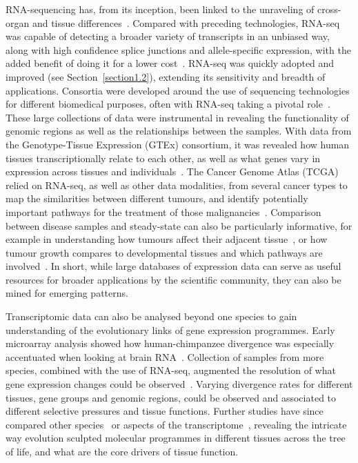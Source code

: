 RNA-sequencing has, from its inception, been linked to the unraveling of cross-organ and tissue differences~\citep{mortazavi_mapping_2008}. Compared with preceding technologies, RNA-seq was capable of detecting a broader variety of transcripts in an unbiased way, along with high confidence splice junctions and allele-specific expression, with the added benefit of doing it for a lower cost~\citep{wang_rna-seq:_2009}. RNA-seq was quickly adopted and improved (see Section~\ref{section1.2}), extending its sensitivity and breadth of applications. Consortia were developed around the use of sequencing technologies for different biomedical purposes, often with RNA-seq taking a pivotal role~\citep{the_cancer_genome_atlas_research_network_cancer_2013,the_encode_project_consortium_integrated_2012,lonsdale_genotype-tissue_2013}. These large collections of data were instrumental in revealing the functionality of genomic regions as well as the relationships between the samples. With data from the Genotype-Tissue Expression (GTEx) consortium, it was revealed how human tissues transcriptionally relate to each other, as well as what genes vary in expression across tissues and individuals~\citep{mele_human_2015}. The Cancer Genome Atlas (TCGA) relied on RNA-seq, as well as other data modalities, from several cancer types to map the similarities between different tumours, and identify potentially important pathways for the treatment of those malignancies~\citep{hoadley_cell--origin_2018}. Comparison between disease samples and steady-state can also be particularly informative, for example in understanding how tumours affect their adjacent tissue~\citep{aran_comprehensive_2017}, or how tumour growth compares to developmental tissues and which pathways are involved~\citep{young_single-cell_2018}. In short, while large databases of expression data can serve as useful resources for broader applications by the scientific community, they can also be mined for emerging patterns.

Transcriptomic data can also be analysed beyond one species to gain understanding of the evolutionary links of gene expression programmes. Early microarray analysis showed how human-chimpanzee divergence was especially accentuated when looking at brain RNA~\citep{enard_intra-_2002}. Collection of samples from more species, combined with the use of RNA-seq, augmented the resolution of what gene expression changes could be observed~\citep{brawand_evolution_2011}. Varying divergence rates for different tissues, gene groups and genomic regions, could be observed and associated to different selective pressures and tissue functions. Further studies have since compared other species~\citep{li_comparison_2014} or aspects of the transcriptome~\citep{barbosa-morais_evolutionary_2012}, revealing the intricate way evolution sculpted molecular programmes in different tissues across the tree of life, and what are the core drivers of tissue function. 

